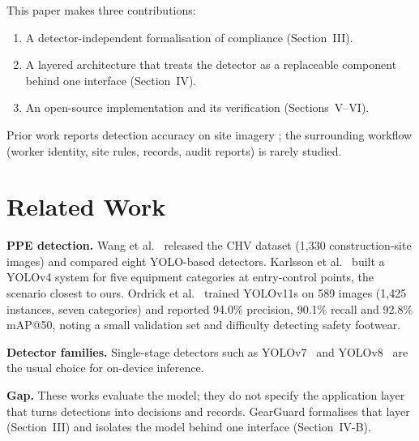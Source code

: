 \documentclass[conference]{IEEEtran}
\begin{document}
This paper makes three contributions:
\begin{enumerate}
  \item A detector-independent formalisation of compliance (Section~III).
  \item A layered architecture that treats the detector as a replaceable
        component behind one interface (Section~IV).
  \item An open-source implementation and its verification (Sections~V--VI).
\end{enumerate}
Prior work reports detection accuracy on site imagery
\cite{wang2021chv,karlsson2022,ordrick2025}; the surrounding workflow (worker
identity, site rules, records, audit reports) is rarely studied.

\section{Related Work}
\textbf{PPE detection.} Wang et al.~\cite{wang2021chv} released the CHV dataset
(1{,}330 construction-site images) and compared eight YOLO-based detectors.
Karlsson et al.~\cite{karlsson2022} built a YOLOv4 system for five equipment
categories at entry-control points, the scenario closest to ours.
Ordrick et al.~\cite{ordrick2025} trained YOLOv11s on 589 images (1{,}425
instances, seven categories) and reported 94.0\% precision, 90.1\% recall and
92.8\% mAP@50, noting a small validation set and difficulty detecting safety
footwear.

\textbf{Detector families.} Single-stage detectors such as
YOLOv7~\cite{wang2023yolov7} and YOLOv8~\cite{jocher2023yolov8} are the usual
choice for on-device inference.

\textbf{Gap.} These works evaluate the model; they do not specify the
application layer that turns detections into decisions and records. GearGuard
formalises that layer (Section~III) and isolates the model behind one interface
(Section~IV-B).
\end{document}
